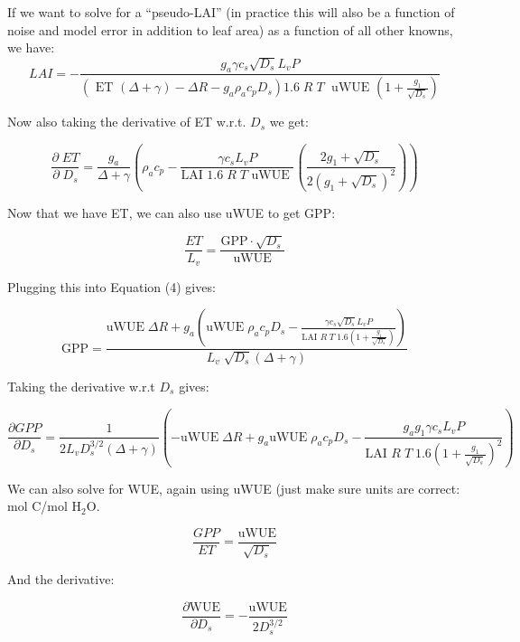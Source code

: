 If we want to solve for a ``pseudo-LAI'' (in practice this will also be a function of noise and model error in addition to leaf area) as a function of all other knowns, we have:
\begin{equation}
LAI  = - \frac{g_a \gamma c_s \sqrt{D_s} L_v P }{ \left(\text{ ET } ( \Delta + \gamma) - \Delta R - g_a \rho_a c_p D_{s}\right) 1.6 \; R\; T\; \text{ uWUE } (1 + \frac{g_1}{\sqrt{D_s}})}
\end{equation}

Now also taking the derivative of ET w.r.t. $D_s$ we get:

\begin{equation}
\frac{\partial \;  ET}{\partial \; D_s} = \frac{g_a}{\Delta + \gamma}   \left( \rho_a c_p - \frac{\gamma c_s L_v  P }{\text{LAI }1.6 \; R\; T \text{ uWUE }} \left( \frac{2 g_1 + \sqrt{D_s}}{2 (g_1 + \sqrt{D_s})^2}\right) \right)
\end{equation}

Now that we have ET, we can also use uWUE to get GPP:

\begin{equation}
  \frac{ET}{L_v} = \frac{\text{GPP} \cdot \sqrt{D_s}}{  \text{uWUE}}
\end{equation}

Plugging this into Equation (4) gives:

\begin{equation}
  \text{GPP} = \frac{\text{uWUE}\; \Delta R + g_a \left( \text{uWUE}\; \rho_a c_p D_{s} - \frac{\gamma c_s \sqrt{D_s} L_v P }{\text{LAI } R \; T \; 1.6  (1 + \frac{g_1}{\sqrt{D_s}})} \right) }{L_v \; \sqrt{D_s} \left(\Delta + \gamma \right)}
\end{equation}

Taking the derivative w.r.t $D_s$ gives:

\begin{equation}
  \frac{\partial GPP}{\partial D_s} = \frac{1}{2 L_v D_s^{3/2} \left(\Delta + \gamma \right)} \left( -\text{uWUE}\; \Delta R + g_a \text{uWUE}\; \rho_a c_p  D_s - \frac{g_a g_1  \gamma c_s L_v P }{\text{LAI } R \; T \; 1.6 ( 1 + \frac{g_1}{\sqrt{D_s}})^2 } \right)
\end{equation}

We can also solve for WUE, again using uWUE (just make sure units are correct: mol C/mol H$_2$O.

\begin{equation}
\frac{GPP}{ET} = \frac{\text{uWUE}}{\sqrt{D_s}}
\end{equation}

And the derivative:

\begin{equation}
  \frac{\partial \text{WUE}}{\partial D_s} = -\frac{\text{uWUE}}{2 D_s^{3/2}}
\end{equation}


